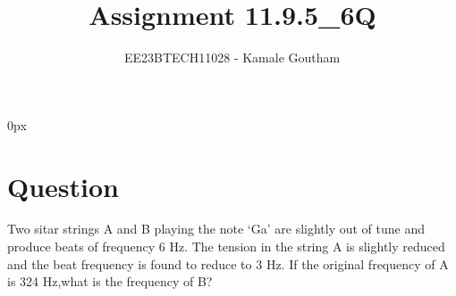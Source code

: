 \documentclass[journal,12pt,twocolumn]{IEEEtran}
\begin{document}
\parindent 0px

\title{Assignment 11.9.5\_6Q}
\author{EE23BTECH11028 - Kamale Goutham$^{}$%
}
\maketitle
\newpage
\bigskip
\section*{Question}
Two sitar strings A and B playing the note ‘Ga’ are slightly out of tune and produce beats of frequency 6 Hz. The tension in the string A is slightly reduced and the beat frequency is found to reduce to 3 Hz. If the original frequency of A is 324 Hz,what is the frequency of B?\\
\end{document}
